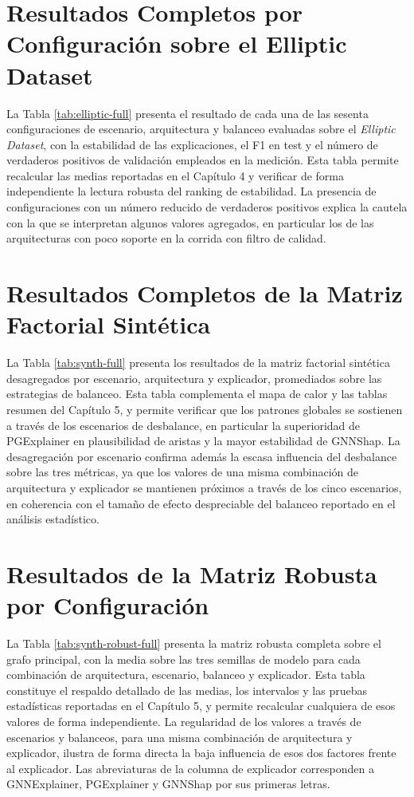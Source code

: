 \section{Resultados Completos por Configuración sobre el Elliptic Dataset}

La Tabla \ref{tab:elliptic-full} presenta el resultado de cada una de las sesenta configuraciones de escenario, arquitectura y balanceo evaluadas sobre el \textit{Elliptic Dataset}, con la estabilidad de las explicaciones, el F1 en test y el número de verdaderos positivos de validación empleados en la medición. Esta tabla permite recalcular las medias reportadas en el Capítulo 4 y verificar de forma independiente la lectura robusta del ranking de estabilidad. La presencia de configuraciones con un número reducido de verdaderos positivos explica la cautela con la que se interpretan algunos valores agregados, en particular los de las arquitecturas con poco soporte en la corrida con filtro de calidad.



\section{Resultados Completos de la Matriz Factorial Sintética}

La Tabla \ref{tab:synth-full} presenta los resultados de la matriz factorial sintética desagregados por escenario, arquitectura y explicador, promediados sobre las estrategias de balanceo. Esta tabla complementa el mapa de calor y las tablas resumen del Capítulo 5, y permite verificar que los patrones globales se sostienen a través de los escenarios de desbalance, en particular la superioridad de PGExplainer en plausibilidad de aristas y la mayor estabilidad de GNNShap. La desagregación por escenario confirma además la escasa influencia del desbalance sobre las tres métricas, ya que los valores de una misma combinación de arquitectura y explicador se mantienen próximos a través de los cinco escenarios, en coherencia con el tamaño de efecto despreciable del balanceo reportado en el análisis estadístico.



\section{Resultados de la Matriz Robusta por Configuración}

La Tabla \ref{tab:synth-robust-full} presenta la matriz robusta completa sobre el grafo principal, con la media sobre las tres semillas de modelo para cada combinación de arquitectura, escenario, balanceo y explicador. Esta tabla constituye el respaldo detallado de las medias, los intervalos y las pruebas estadísticas reportadas en el Capítulo 5, y permite recalcular cualquiera de esos valores de forma independiente. La regularidad de los valores a través de escenarios y balanceos, para una misma combinación de arquitectura y explicador, ilustra de forma directa la baja influencia de esos dos factores frente al explicador. Las abreviaturas de la columna de explicador corresponden a GNNExplainer, PGExplainer y GNNShap por sus primeras letras.

